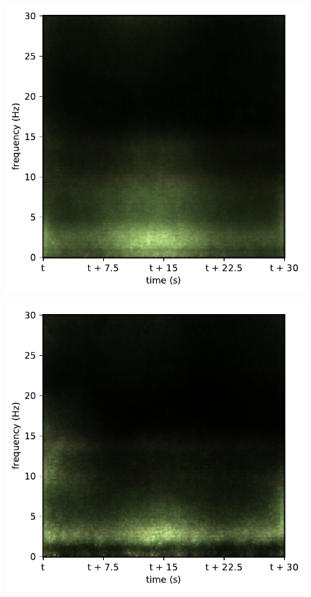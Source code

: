 \begin{subfigure}{.16\textwidth}
  \centering
  \includegraphics[width=1\linewidth]{./../Article/pics/class_master_2}
  \caption{}
  \label{fig_1_23}
\end{subfigure}%
\begin{subfigure}{.16\textwidth}
  \centering
  \includegraphics[width=1\linewidth]{./../Article/pics/class_master_3}
  \caption{}
  \label{fig_1_24}
\end{subfigure}%
